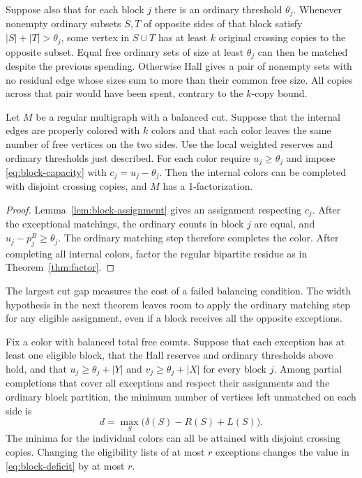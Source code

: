 Suppose also that for each block \(j\) there is an ordinary threshold \(\theta_j\). Whenever nonempty ordinary subsets \(S,T\) of opposite sides of that block satisfy \(|S|+|T|>\theta_j\), some vertex in \(S\cup T\) has at least \(k\) original crossing copies to the opposite subset. Equal free ordinary sets of size at least \(\theta_j\) can then be matched despite the previous spending. Otherwise Hall gives a pair of nonempty sets with no residual edge whose sizes sum to more than their common free size. All copies across that pair would have been spent, contrary to the \(k\)-copy bound.

\begin{corollary}\label{cor:block-factorization}
Let \(M\) be a regular multigraph with a balanced cut. Suppose that the internal edges are properly colored with \(k\) colors and that each color leaves the same number of free vertices on the two sides. Use the local weighted reserves and ordinary thresholds just described. For each color require \(u_j\ge\theta_j\) and impose \eqref{eq:block-capacity} with \(c_j=u_j-\theta_j\). Then the internal colors can be completed with disjoint crossing copies, and \(M\) has a 1-factorization.
\end{corollary}

\begin{proof}
Lemma~\ref{lem:block-assignment} gives an assignment respecting \(c_j\). After the exceptional matchings, the ordinary counts in block \(j\) are equal, and \(u_j-p^B_j\ge\theta_j\). The ordinary matching step therefore completes the color. After completing all internal colors, factor the regular bipartite residue as in Theorem~\ref{thm:factor}.
\end{proof}

The largest cut gap measures the cost of a failed balancing condition. The width hypothesis in the next theorem leaves room to apply the ordinary matching step for any eligible assignment, even if a block receives all the opposite exceptions.

\begin{theorem}\label{thm:block-deficit}
Fix a color with balanced total free counts. Suppose that each exception has at least one eligible block, that the Hall reserves and ordinary thresholds above hold, and that \(u_j\ge\theta_j+|Y|\) and \(v_j\ge\theta_j+|X|\) for every block \(j\). Among partial completions that cover all exceptions and respect their assignments and the ordinary block partition, the minimum number of vertices left unmatched on each side is
\[
 d=\max_S\bigl(\delta(S)-R(S)+L(S)\bigr).
 \tag{E}\label{eq:block-deficit}
\]
The minima for the individual colors can all be attained with disjoint crossing copies. Changing the eligibility lists of at most \(r\) exceptions changes the value in \eqref{eq:block-deficit} by at most \(r\).
\end{theorem}

